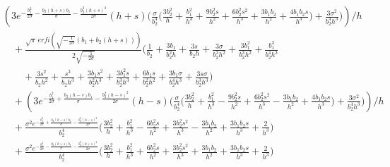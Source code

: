 \documentclass{article}
\begin{document}
	
\begin{align}
	&(3 e^{- \frac{b_1^2}{2\sigma} - \frac{b_2 (h+s) b_1}{\sigma}
		- \frac{b_2^2 (h+s)^2}{2\sigma}}
	(h+s)
	\Big(
	\frac{\sigma}{b_2^4}
	\big(
	\frac{3 b_2^2}{h}
	+ \frac{b_1^2}{h^3}
	+ \frac{9 b_2^2 s}{h^2}
	+ \frac{6 b_2^2 s^2}{h^3}
	+ \frac{3 b_1 b_2}{h^2}
	+ \frac{4 b_1 b_2 s}{h^3}
	\big)
	+ \frac{3\sigma^2}{b_2^4 h^3}
	\Big)
	)/h
	\\[4pt]
	&\quad
	+ \frac{\sqrt{\pi}\,
		erfi\!\left(\sqrt{-\frac{1}{2\sigma}}(b_1+b_2(h+s))\right)}
	{2\sqrt{-\frac{1}{2\sigma}}}
	\Big(
	\frac{1}{b_2}
	+ \frac{3 b_1}{b_2^2 h}
	+ \frac{3 s}{b_2 h}
	+ \frac{3\sigma}{b_2^3 h^2}
	+ \frac{3 b_1^2}{b_2^3 h^2}
	+ \frac{b_1^3}{b_2^4 h^3}
	\\
	&\qquad
	+ \frac{3 s^2}{b_2 h^2}
	+ \frac{s^3}{b_2 h^3}
	+ \frac{3 b_1 s^2}{b_2^2 h^3}
	+ \frac{3 b_1^2 s}{b_2^3 h^3}
	+ \frac{6 b_1 s}{b_2^2 h^2}
	+ \frac{3 b_1 \sigma}{b_2^4 h^3}
	+ \frac{3 s\sigma}{b_2^3 h^3}
	\Big)
	\\[6pt]
	&\quad
	+ (3 e^{- \frac{b_1^2}{2\sigma} + \frac{b_2(h-s)b_1}{\sigma}
		- \frac{b_2^2(h-s)^2}{2\sigma}}
	(h-s)
	\Big(
	\frac{\sigma}{b_2^4}
	\big(
	\frac{3 b_2^2}{h}
	+ \frac{b_1^2}{h^3}
	- \frac{9 b_2^2 s}{h^2}
	+ \frac{6 b_2^2 s^2}{h^3}
	- \frac{3 b_1 b_2}{h^2}
	+ \frac{4 b_1 b_2 s}{h^3}
	\big)
	+ \frac{3\sigma^2}{b_2^4 h^3}
	\Big)
	)/h
	\\[6pt]
	&\quad
	+ \frac{\sigma^2 e^{- \frac{b_1^2}{2\sigma} + \frac{b_2(h-s)b_1}{\sigma}
			- \frac{b_2^2(h-s)^2}{2\sigma}}}{b_2^4}
	\Big(
	\frac{3 b_2^2}{h}
	+ \frac{b_1^2}{h^3}
	- \frac{6 b_2^2 s}{h^2}
	+ \frac{3 b_2^2 s^2}{h^3}
	- \frac{3 b_1 b_2}{h^2}
	+ \frac{3 b_1 b_2 s}{h^3}
	+ \frac{2}{h^3}
	\Big)
	\\[6pt]
	&\quad
	+ \frac{\sigma^2 e^{- \frac{b_1^2}{2\sigma} - \frac{b_2(h+s)b_1}{\sigma}
			- \frac{b_2^2(h+s)^2}{2\sigma}}}{b_2^4}
	\Big(
	\frac{3 b_2^2}{h}
	+ \frac{b_1^2}{h^3}
	+ \frac{6 b_2^2 s}{h^2}
	+ \frac{3 b_2^2 s^2}{h^3}
	+ \frac{3 b_1 b_2}{h^2}
	+ \frac{3 b_1 b_2 s}{h^3}
	+ \frac{2}{h^3}
	\Big)
\end{align}
\end{document}
